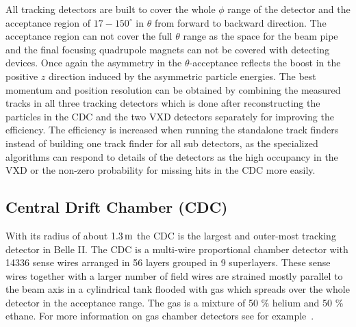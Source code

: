 All tracking detectors are built to cover the whole $\phi$ range of the detector and the acceptance region of $17-150 ^\circ$ in $\theta$ from forward to backward direction. The acceptance region can not cover the full $\theta$ range as the space for the beam pipe and the final focusing quadrupole magnets can not be covered with detecting devices. Once again the asymmetry in the $\theta$-acceptance reflects the boost in the positive $z$ direction induced by the asymmetric particle energies. The best momentum and position resolution can be obtained by combining the measured tracks in all three tracking detectors which is done after reconstructing the particles in the CDC and the two VXD detectors separately for improving the efficiency. The efficiency is increased when running the standalone track finders instead of building one track finder for all sub detectors, as the specialized algorithms can respond to details of the detectors as the high occupancy in the VXD or the non-zero probability for missing hits in the CDC more easily. 

\subsection{Central Drift Chamber (CDC)}

With its radius of about $\unit[1.3]{m}$ the CDC is the largest and outer-most tracking detector in Belle II. The CDC is a multi-wire proportional chamber detector with 14336 sense wires arranged in 56 layers grouped in 9 superlayers. These sense wires together with a larger number of field wires are strained mostly parallel to the beam axis in a cylindrical tank flooded with gas which spreads over the whole detector in the acceptance range. The gas is a mixture of 50 \% helium and 50 \% ethane. For more information on gas chamber detectors see for example~\cite{grupen}.

